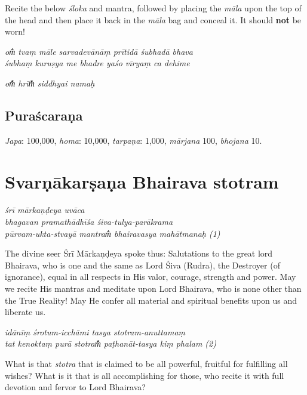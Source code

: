 \documentclass[12pt,oneside,a4paper]{article}
\newenvironment{shloka}[1]
  {\bigskip\center#1\varwidth{\linewidth}}
  {\endvarwidth\endcenter\bigskip}
\newcommand{\tl}[1]{\emph{#1}}
\begin{document}
Recite the below \tl{śloka} and mantra, followed by placing the \tl{māla} upon
the top of the head and then place it back in the \tl{māla} bag and conceal it.
It should \textbf{not} be worn!

\begin{shloka}\itshape
  om̐ tvaṃ māle sarvadevānāṃ prītidā śubhadā bhava\\
  śubhaṃ kuruṣya me bhadre yaśo vīryaṃ ca dehime
\end{shloka}

\begin{shloka}\itshape
  om̐ hrīm̐ siddhyai namaḥ
\end{shloka}

\subsection{Puraścaraṇa}

\tl{Japa}: 100,000, \tl{homa}: 10,000, \tl{tarpaṇa}: 1,000, \tl{mārjana} 100,
\tl{bhojana} 10.
\clearpage

\section{Svarṇākarṣaṇa Bhairava stotram}

\begin{shloka}\itshape
  śrī mārkaṇḍeya uvāca\\
  bhagavan pramathādhīśa śiva-tulya-parākrama\\
  pūrvam-ukta-stvayā mantram̐ bhairavasya mahātmanaḥ (1)
\end{shloka}

The divine seer Śrī Mārkaṇḍeya spoke thus: Salutations to the great lord
Bhairava, who is one and the same as Lord Śiva (Rudra), the Destroyer (of
ignorance), equal in all respects in His valor, courage, strength and power.
May we recite His mantras and meditate upon Lord Bhairava, who is none other
than the True Reality! May He confer all material and spiritual benefits upon
us and liberate us.

\begin{shloka}\itshape
  idānīṃ śrotum-icchāmi tasya stotram-anuttamaṃ\\
  tat kenoktaṃ purā stotram̐ paṭhanāt-tasya kiṃ phalam (2)
\end{shloka}

What is that \tl{stotra} that is claimed to be all powerful, fruitful for
fulfilling all wishes? What is it that is all accomplishing for those, who
recite it with full devotion and fervor to Lord Bhairava?
\end{document}

